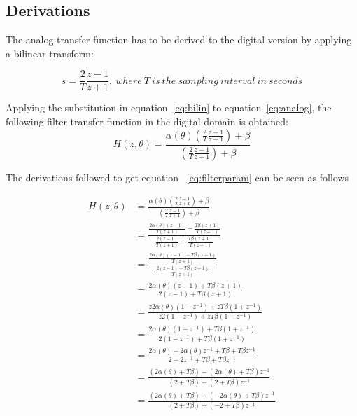 \documentclass[journal]{IEEEtran}
\begin{document}
\pagebreak



\begin{appendices}

\section{Derivations}
The analog transfer function has to be derived to the digital version by applying a bilinear transform:

\begin{equation}\label{eq:bilin}
s = \frac{2}{T} \frac{z-1}{z+1},\: where\:T\:is\:the\:sampling\:interval\:in\:seconds
\end{equation}


Applying the substitution in equation~\ref{eq:bilin} to equation~\ref{eq:analog}, the following filter transfer function in the digital domain is obtained:
\begin{equation}\label{eq:filter}
H\left( z,\theta\right) = \frac{\alpha (\theta)(\frac{2}{T} \frac{z-1}{z+1})+\beta}{(\frac{2}{T} \frac{z-1}{z+1})+\beta}
\end{equation}

The derivations followed to get equation ~\ref{eq:filterparam} can be seen as follows

\begin{equation*}\label{eq:DerivationFilterCoeff}
\begin{split}
H\left( z,\theta\right) &=\frac{\alpha (\theta)(\frac{2}{T} \frac{z-1}{z+1})+\beta}{(\frac{2}{T} \frac{z-1}{z+1})+\beta}\\
                                   &= \frac{\frac{2\alpha (\theta)(z-1)}{T(z+1)}+\frac{T\beta(z+1)}{T(z+1)}}{\frac{2(z-1)}{T(z+1)}+\frac{T\beta(z+1)}{T(z+1)}}\\  
			   &=\frac{\frac{2\alpha (\theta)(z-1)+T\beta(z+1)}{T(z+1)}}{\frac{2(z-1)+T\beta(z+1)}{T(z+1)}}\\
			  &=\frac{2\alpha (\theta)(z-1)+T\beta(z+1)}{2(z-1)+T\beta(z+1)}\\
			 &=\frac{z2\alpha (\theta)(1-z^{-1})+zT\beta(1+z^{-1})}{z2(1-z^{-1})+zT\beta(1+z^{-1})}\\
			&=\frac{2\alpha (\theta)(1-z^{-1})+T\beta(1+z^{-1})}{2(1-z^{-1})+T\beta(1+z^{-1})}\\
			&=\frac{2\alpha (\theta)-2\alpha (\theta)z^{-1}+T\beta+T\beta z^{-1}}{2-2z^{-1}+T\beta+T\beta z^{-1}}\\
			&=\frac{(2\alpha (\theta)+T\beta)-(2\alpha (\theta)+T\beta)z^{-1}}{(2+T\beta)-(2+T\beta)z^{-1}}\\
			&=\frac{(2\alpha (\theta)+T\beta)+(-2\alpha (\theta)+T\beta)z^{-1}}{(2+T\beta)+(-2+T\beta)z^{-1}}\\
\end{split}
\end{equation*} 




\end{appendices}
\end{document}
